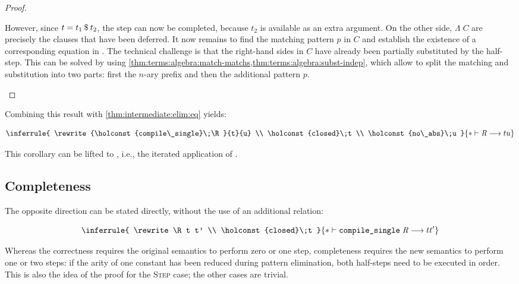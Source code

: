 \begin{proof}
\begin{induction}
\begin{semantics}
          However, since $t = t_1\mathbin{\$}t_2$, the step can now be completed, because $t_2$ is available as an extra argument.
          On the other side, $\Lambda\;C$ are precisely the clauses that have been deferred.
          It now remains to find the matching pattern $p$ in $C$ and establish the existence of a corresponding equation in \R.
          The technical challenge is that the right-hand sides in $C$ have already been partially substituted by the half-step.
          This can be solved by using \cref{thm:terms:algebra:match-matchs,thm:terms:algebra:subst-indep}, which allow to split the matching and substitution into two parts: first the $n$-ary prefix and then the additional pattern $p$. \qedhere
      \end{semantics}
  \end{induction}
\end{proof}

\noindent
Combining this result with \cref{thm:intermediate:elim:eq} yields:

\begin{corollary}
  \[
    \inferrule{
      \rewrite{\holconst{compile\_single}\;\R}{t}{u} \\
      \holconst{closed}\;t \\
      \holconst{no\_abs}\;u
    }{
      \rewrite*\R t u
    }
  \]
\end{corollary}

\noindent
This corollary can be lifted to , i.e., the iterated application of .

\subsection{Completeness}


\noindent
The opposite direction can be stated directly, without the use of an additional relation:

\begin{theorem}\label{thm:intermediate:elim:completeness}
  \[
    \inferrule{
      \rewrite\R t t' \\
      \holconst{closed}\;t
    }{
      \rewrite*{\holconst{compile\_single}\;\R}{t}{t'}
    }
  \]
\end{theorem}

\noindent
Whereas the correctness requires the original semantics to perform zero or one step, completeness requires the new semantics to perform one or two steps:
if the arity of one constant has been reduced during pattern elimination, both half-steps need to be executed in order.
This is also the idea of the proof for the \textsc{Step} case; the other cases are trivial.

